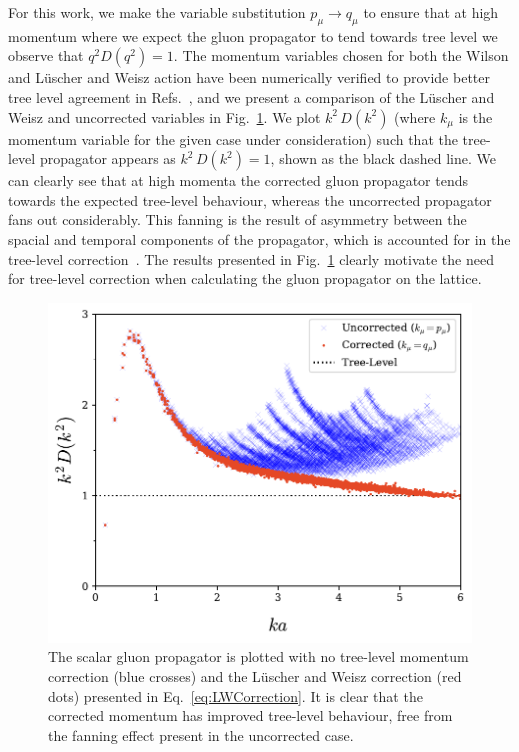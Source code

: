 For this work, we make the variable substitution $p_\mu\rightarrow q_\mu$ to ensure that at high momentum where we expect the gluon propagator to tend towards tree level we observe that $q^2 D(q^2) = 1$. The momentum variables chosen for both the Wilson and L\"uscher and Weisz action have been numerically verified to provide better tree level agreement in Refs.~\cite{Marenzoni:1994ap, Bonnet:2001uh}, and we present a comparison of the L\"uscher and Weisz and uncorrected variables in Fig.~\ref{fig:MomentumComparison}. We plot $k^2\,D(k^2)$ (where $k_\mu$ is the momentum variable for the given case under consideration) such that the tree-level propagator appears as $k^2\,D(k^2)=1$, shown as the black dashed line. We can clearly see that at high momenta the corrected gluon propagator tends towards the expected tree-level behaviour, whereas the uncorrected propagator fans out considerably. This fanning is the result of asymmetry between the spacial and temporal components of the propagator, which is accounted for in the tree-level correction~\cite{Marenzoni:1994ap}. The results presented in Fig.~\ref{fig:MomentumComparison} clearly motivate the need for tree-level correction when calculating the gluon propagator on the lattice.\\
%
\begin{figure}[htb!]
\centering
\includegraphics[width=\linewidth]{./ScalarGluComp_q2_MomentumComparison.pdf}
\caption{\label{fig:MomentumComparison} The scalar gluon propagator is plotted with no tree-level momentum correction (blue crosses) and the L\"uscher and Weisz correction (red dots) presented in Eq.~\ref{eq:LWCorrection}. It is clear that the corrected momentum has improved tree-level behaviour, free from the fanning effect present in the uncorrected case.}
\end{figure}
%
